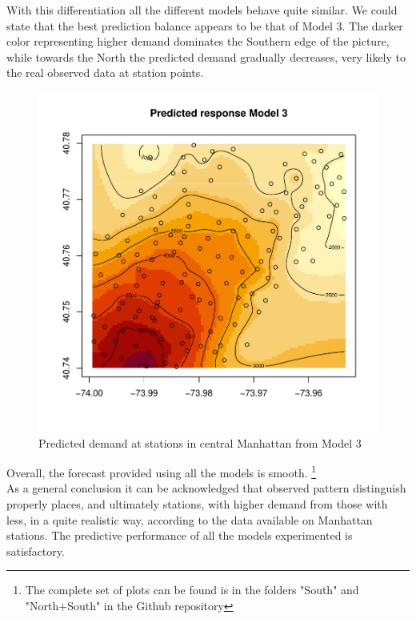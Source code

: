 \documentclass[12pt]{article}
\begin{document}
\noindent
With this differentiation all the different models behave quite similar. We could state that the best prediction balance appears to be that of Model 3. The darker color representing higher demand dominates the Southern edge of the picture, while towards the North the predicted demand gradually decreases, very likely to the real observed data at station points.\\
\begin{figure}[H]
		\centering
		\includegraphics[scale=0.5]{Plots_North+South/v3_both_pred_stations.pdf}
		\caption{Predicted demand at stations in central Manhattan from Model 3}
\end{figure}
\noindent
Overall, the forecast provided using all the models is smooth. 
\footnote{The complete set of plots can be found is in the folders "South" and "North+South" in the Github repository}\\

\noindent
As a general conclusion it can be acknowledged that observed pattern distinguish properly places, and ultimately stations, with higher demand from those with less, in a quite realistic way, according to the data available on Manhattan stations. The predictive performance of all the models experimented is satisfactory.
 
 
\end{document}
